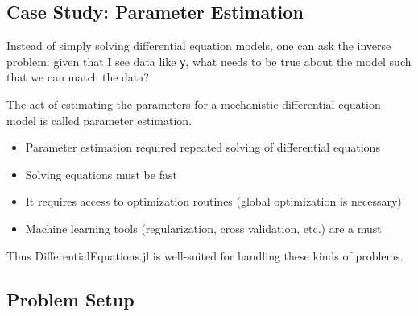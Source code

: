 \documentclass[11pt]{article}
\begin{document}
    \subsection{Case Study: Parameter
Estimation}\label{case-study-parameter-estimation}

Instead of simply solving differential equation models, one can ask the
inverse problem: given that I see data like \texttt{y}, what needs to be
true about the model such that we can match the data?

The act of estimating the parameters for a mechanistic differential
equation model is called parameter estimation.

\begin{itemize}
\itemsep1pt\parskip0pt
\item
  Parameter estimation required repeated solving of differential
  equations
\item
  Solving equations must be fast
\item
  It requires access to optimization routines (global optimization is
  necessary)
\item
  Machine learning tools (regularization, cross validation, etc.) are a
  must
\end{itemize}

Thus DifferentialEquations.jl is well-suited for handling these kinds of
problems.

    \subsection{Problem Setup}\label{problem-setup}
\end{document}
